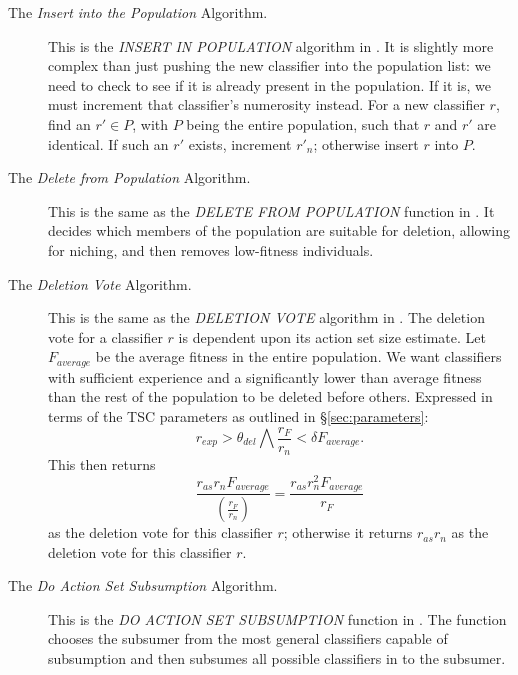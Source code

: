 \begin{description}
\item [The \emph{Insert into the Population} Algorithm.]
This is the \emph{INSERT IN POPULATION} algorithm in \cite{ButzWilson}.
It is slightly more complex than just pushing the new classifier into the population list:
we need to check to see if it is already present in the population.
If it is, we must increment that classifier's numerosity instead.
For a new classifier $r$, find an $r' \in P$,
with $P$ being the entire population,
such that $r$ and $r'$ are identical.
If such an $r'$ exists, increment $r'_n$;
otherwise insert $r$ into $P$.

\item [The \emph{Delete from Population} Algorithm.]
This is the same as the \emph{DELETE FROM POPULATION} function in \cite{ButzWilson}.
It decides which members of the population are suitable for deletion, allowing for niching, and then removes low-fitness individuals.

\item [The \emph{Deletion Vote} Algorithm.]
\label{sec:deletion-vote}
This is the same as the \emph{DELETION VOTE} algorithm in \cite{ButzWilson}.
The deletion vote for a classifier $r$ is dependent upon its action set size estimate.
Let $F_{average}$ be the average fitness in the entire population.
We want classifiers with sufficient experience and a significantly lower than average fitness than the rest of the population to be deleted before others.
Expressed in terms of the TSC parameters as outlined in \S\ref{sec:parameters}:
\begin{equation}
r_{exp} > \theta_{del} \bigwedge \frac{r_F}{r_n} < \delta F_{average}.
\end{equation}
This then returns
\begin{equation}
\frac{r_{as} r_n F_{average}}
   {\left( \frac{r_F}
               {r_n} \right)}
= 
\frac{r_{as} r_n^2 F_{average}}
   {r_F}
\end{equation}
as the deletion vote for this classifier $r$;
otherwise it returns
$r_{as} r_n$
as the deletion vote for this classifier $r$.

\item [The \emph{Do Action Set Subsumption} Algorithm.]
This is the \emph{DO ACTION SET SUBSUMPTION} function in \cite{ButzWilson}.
The function chooses the subsumer from the most general classifiers capable of subsumption and then subsumes all possible classifiers in to the subsumer.


\end{description}
